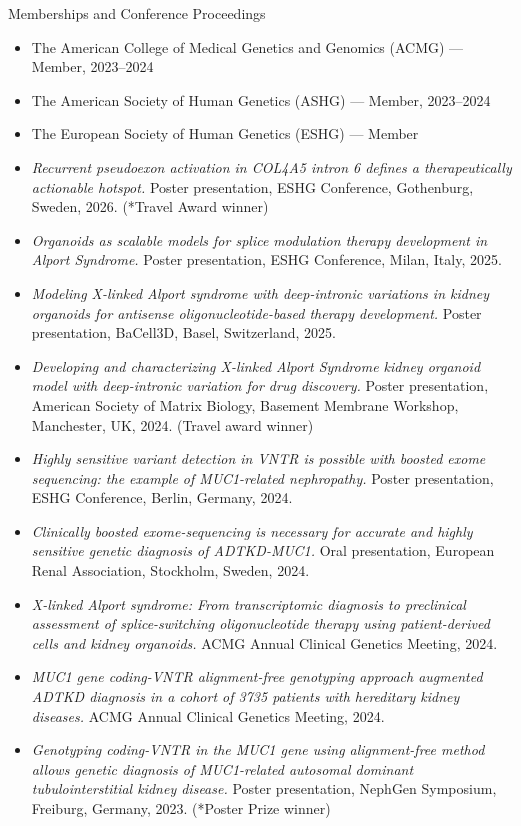 \documentclass[
	11pt, %
]{resume} %
\begin{document}
\begin{rSection}{Memberships and Conference Proceedings}
\begin{itemize}
  \item The American College of Medical Genetics and Genomics (ACMG) — Member, 2023–2024
  \item The American Society of Human Genetics (ASHG) — Member, 2023–2024
  \item The European Society of Human Genetics (ESHG) — Member
  \item \textit{Recurrent pseudoexon activation in COL4A5 intron 6 defines a therapeutically actionable hotspot.} Poster presentation, ESHG Conference, Gothenburg, Sweden, 2026. (*Travel Award winner)
  \item \textit{Organoids as scalable models for splice modulation therapy development in Alport Syndrome.} Poster presentation, ESHG Conference, Milan, Italy, 2025.
  \item \textit{Modeling X-linked Alport syndrome with deep-intronic variations in kidney organoids for antisense oligonucleotide-based therapy development.} Poster presentation, BaCell3D, Basel, Switzerland, 2025.
  \item \textit{Developing and characterizing X-linked Alport Syndrome kidney organoid model with deep-intronic variation for drug discovery.} Poster presentation, American Society of Matrix Biology, Basement Membrane Workshop, Manchester, UK, 2024. (Travel award winner)
  \item \textit{Highly sensitive variant detection in VNTR is possible with boosted exome sequencing: the example of MUC1-related nephropathy.} Poster presentation, ESHG Conference, Berlin, Germany, 2024.
  \item \textit{Clinically boosted exome-sequencing is necessary for accurate and highly sensitive genetic diagnosis of ADTKD-MUC1.} Oral presentation, European Renal Association, Stockholm, Sweden, 2024.
  \item \textit{X-linked Alport syndrome: From transcriptomic diagnosis to preclinical assessment of splice-switching oligonucleotide therapy using patient-derived cells and kidney organoids.} ACMG Annual Clinical Genetics Meeting, 2024.
  \item \textit{MUC1 gene coding-VNTR alignment-free genotyping approach augmented ADTKD diagnosis in a cohort of 3735 patients with hereditary kidney diseases.} ACMG Annual Clinical Genetics Meeting, 2024.
  \item \textit{Genotyping coding-VNTR in the MUC1 gene using alignment-free method allows genetic diagnosis of MUC1-related autosomal dominant tubulointerstitial kidney disease.} Poster presentation, NephGen Symposium, Freiburg, Germany, 2023. (*Poster Prize winner)

\end{itemize}
\end{rSection}
\end{document}
